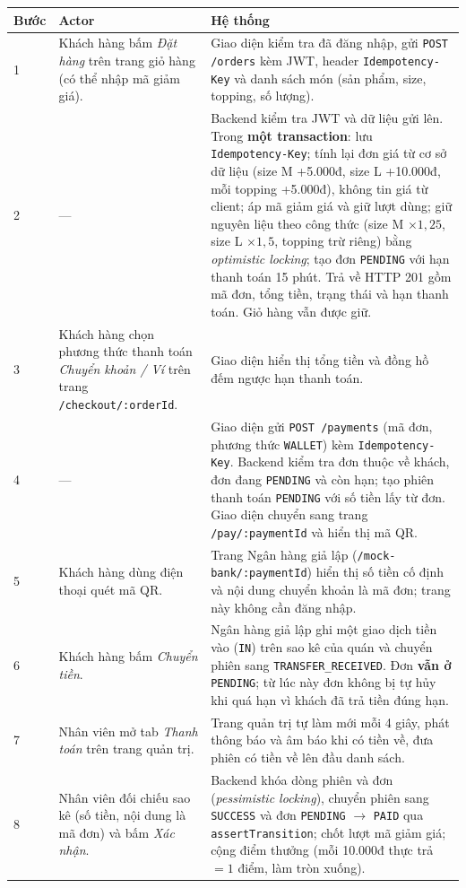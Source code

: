\begin{longtable}{@{}p{0.8cm}p{5.4cm}p{9.8cm}@{}}
\toprule
\textbf{Bước} & \textbf{Actor} & \textbf{Hệ thống} \\
\midrule
\endhead
1 & Khách hàng bấm \emph{Đặt hàng} trên trang giỏ hàng (có thể nhập mã giảm giá).
  & Giao diện kiểm tra đã đăng nhập, gửi \texttt{POST /orders} kèm JWT, header \texttt{Idempotency-Key} và danh sách món (sản phẩm, size, topping, số lượng). \\
2 & ---
  & Backend kiểm tra JWT và dữ liệu gửi lên. Trong \textbf{một transaction}: lưu \texttt{Idempotency-Key}; tính lại đơn giá từ cơ sở dữ liệu (size M +5.000đ, size L +10.000đ, mỗi topping +5.000đ), không tin giá từ client; áp mã giảm giá và giữ lượt dùng; giữ nguyên liệu theo công thức (size M $\times 1{,}25$, size L $\times 1{,}5$, topping trừ riêng) bằng \emph{optimistic locking}; tạo đơn \texttt{PENDING} với hạn thanh toán 15 phút. Trả về HTTP 201 gồm mã đơn, tổng tiền, trạng thái và hạn thanh toán. Giỏ hàng vẫn được giữ. \\
3 & Khách hàng chọn phương thức thanh toán \emph{Chuyển khoản / Ví} trên trang \texttt{/checkout/:orderId}.
  & Giao diện hiển thị tổng tiền và đồng hồ đếm ngược hạn thanh toán. \\
4 & ---
  & Giao diện gửi \texttt{POST /payments} (mã đơn, phương thức \texttt{WALLET}) kèm \texttt{Idempotency-Key}. Backend kiểm tra đơn thuộc về khách, đơn đang \texttt{PENDING} và còn hạn; tạo phiên thanh toán \texttt{PENDING} với số tiền lấy từ đơn. Giao diện chuyển sang trang \texttt{/pay/:paymentId} và hiển thị mã QR. \\
5 & Khách hàng dùng điện thoại quét mã QR.
  & Trang Ngân hàng giả lập (\texttt{/mock-bank/:paymentId}) hiển thị số tiền cố định và nội dung chuyển khoản là mã đơn; trang này không cần đăng nhập. \\
6 & Khách hàng bấm \emph{Chuyển tiền}.
  & Ngân hàng giả lập ghi một giao dịch tiền vào (\texttt{IN}) trên sao kê của quán và chuyển phiên sang \texttt{TRANSFER\_RECEIVED}. Đơn \textbf{vẫn ở} \texttt{PENDING}; từ lúc này đơn không bị tự hủy khi quá hạn vì khách đã trả tiền đúng hạn. \\
7 & Nhân viên mở tab \emph{Thanh toán} trên trang quản trị.
  & Trang quản trị tự làm mới mỗi 4 giây, phát thông báo và âm báo khi có tiền về, đưa phiên có tiền về lên đầu danh sách. \\
8 & Nhân viên đối chiếu sao kê (số tiền, nội dung là mã đơn) và bấm \emph{Xác nhận}.
  & Backend khóa dòng phiên và đơn (\emph{pessimistic locking}), chuyển phiên sang \texttt{SUCCESS} và đơn \texttt{PENDING} $\rightarrow$ \texttt{PAID} qua \texttt{assertTransition}; chốt lượt mã giảm giá; cộng điểm thưởng (mỗi 10.000đ thực trả $= 1$ điểm, làm tròn xuống). \\

\end{longtable}
